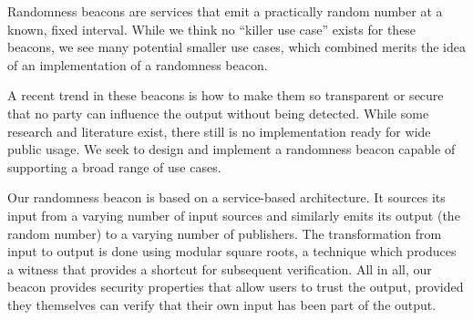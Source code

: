 Randomness beacons are services that emit a practically random number at a known, fixed interval. While we think no \enquote{killer use case} exists for these beacons, we see many potential smaller use cases, which combined merits the idea of an implementation of a randomness beacon.

A recent trend in these beacons is how to make them so transparent or secure that no party can influence the output without being detected. While some research and literature exist, there still is no implementation ready for wide public usage. We seek to design and implement a randomness beacon capable of supporting a broad range of use cases.%

Our randomness beacon is based on a service-based architecture. It sources its input from a varying number of input sources and similarly emits its output (the random number) to a varying number of publishers. The transformation from input to output is done using modular square roots, a technique which produces a witness that provides a shortcut for subsequent verification. All in all, our beacon provides security properties that allow users to trust the output, provided they themselves can verify that their own input has been part of the output.

